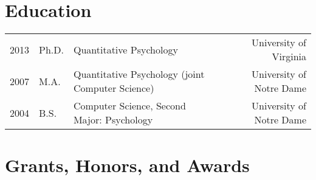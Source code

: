 \documentclass[11pt]{article}
\begin{document}
\section*{Education}
\begin{tabularx}{\textwidth}{llXr}
2013	& Ph.D.		& Quantitative Psychology                     					& University of Virginia\\
2007 	& M.A.		& Quantitative Psychology (joint Computer Science)	& University of Notre Dame\\
2004 	& B.S.		& Computer Science, Second Major: Psychology    		& University of Notre Dame\\
\end{tabularx}


\section*{Grants, Honors, and Awards}
\end{document}
